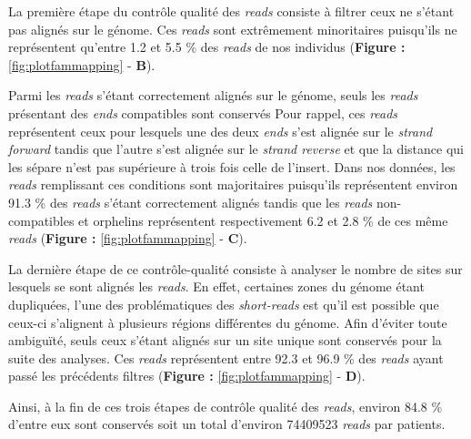 \documentclass[12pt,a4paper,twoside]{ugathesis}
\begin{document}
La première étape du contrôle qualité des \emph{reads} consiste à
filtrer ceux ne s'étant pas alignés sur le génome. Ces \emph{reads} sont
extrêmement minoritaires puisqu'ils ne représentent qu'entre 1.2 et 5.5
\% des \emph{reads} de nos individus (\textbf{Figure :
}\ref{fig:plotfammapping} - \textbf{B}).

Parmi les \emph{reads} s'étant correctement alignés sur le génome, seuls
les \emph{reads} présentant des \emph{ends} compatibles sont conservés
Pour rappel, ces \emph{reads} représentent ceux pour lesquels une des
deux \emph{ends} s'est alignée sur le \emph{strand forward} tandis que
l'autre s'est alignée sur le \emph{strand reverse} et que la distance
qui les sépare n'est pas supérieure à trois fois celle de l'insert. Dans
nos données, les \emph{reads} remplissant ces conditions sont
majoritaires puisqu'ils représentent environ 91.3 \% des \emph{reads}
s'étant correctement alignés tandis que les \emph{reads} non-compatibles
et orphelins représentent respectivement 6.2 et 2.8 \% de ces même
\emph{reads} (\textbf{Figure : }\ref{fig:plotfammapping} - \textbf{C}).

La dernière étape de ce contrôle-qualité consiste à analyser le nombre
de sites sur lesquels se sont alignés les \emph{reads}. En effet,
certaines zones du génome étant dupliquées, l'une des problématiques des
\emph{short-reads} est qu'il est possible que ceux-ci s'alignent à
plusieurs régions différentes du génome. Afin d'éviter toute ambiguïté,
seuls ceux s'étant alignés sur un site unique sont conservés pour la
suite des analyses. Ces \emph{reads} représentent entre 92.3 et 96.9 \%
des \emph{reads} ayant passé les précédents filtres (\textbf{Figure :
}\ref{fig:plotfammapping} - \textbf{D}).

Ainsi, à la fin de ces trois étapes de contrôle qualité des
\emph{reads}, environ 84.8 \% d'entre eux sont conservés soit un total
d'environ 74409523 \emph{reads} par patients.

\newpage 
\end{document}
